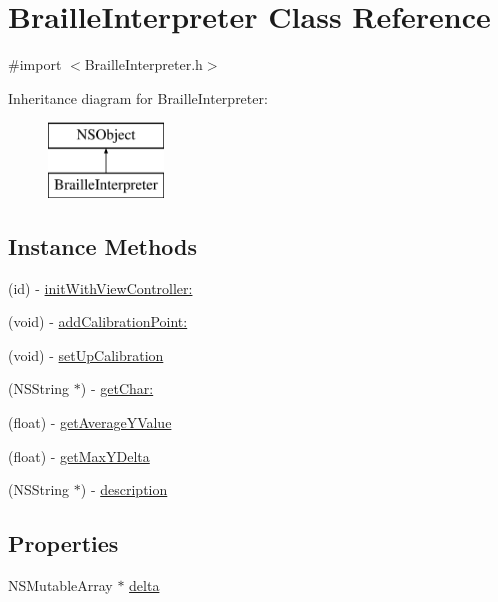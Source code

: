 \hypertarget{interface_braille_interpreter}{\section{Braille\-Interpreter Class Reference}
\label{interface_braille_interpreter}
}


{\ttfamily \#import $<$Braille\-Interpreter.\-h$>$}

Inheritance diagram for Braille\-Interpreter\-:\begin{figure}[H]
\begin{center}
\leavevmode
\includegraphics[height=2.000000cm]{interface_braille_interpreter}
\end{center}
\end{figure}
\subsection*{Instance Methods}
\begin{DoxyCompactItemize}
\item 
(id) -\/ \hyperlink{interface_braille_interpreter_a8404f87aa55fa0be912402895e51f4d2}{init\-With\-View\-Controller\-:}
\item 
(void) -\/ \hyperlink{interface_braille_interpreter_af1b21d0e218be1403c319b5f9c0a61fe}{add\-Calibration\-Point\-:}
\item 
(void) -\/ \hyperlink{interface_braille_interpreter_ae824e9a8f6ae6bc3f2640185fa9386fa}{set\-Up\-Calibration}
\item 
(N\-S\-String $\ast$) -\/ \hyperlink{interface_braille_interpreter_adef2b016def87ebd39c1e14ae4a8106a}{get\-Char\-:}
\item 
(float) -\/ \hyperlink{interface_braille_interpreter_a5269c2f847820096afd38f3dd4aff8ef}{get\-Average\-Y\-Value}
\item 
(float) -\/ \hyperlink{interface_braille_interpreter_aa5383c3c89c8339ad24da161c208aeb0}{get\-Max\-Y\-Delta}
\item 
(N\-S\-String $\ast$) -\/ \hyperlink{interface_braille_interpreter_aaf73ad375f6470e79d42303d64e2622e}{description}
\end{DoxyCompactItemize}
\subsection*{Properties}
\begin{DoxyCompactItemize}
\item 
N\-S\-Mutable\-Array $\ast$ \hyperlink{interface_braille_interpreter_aa96a95089124b5d8c8cbd4c027ac1b60}{delta}
\end{DoxyCompactItemize}


